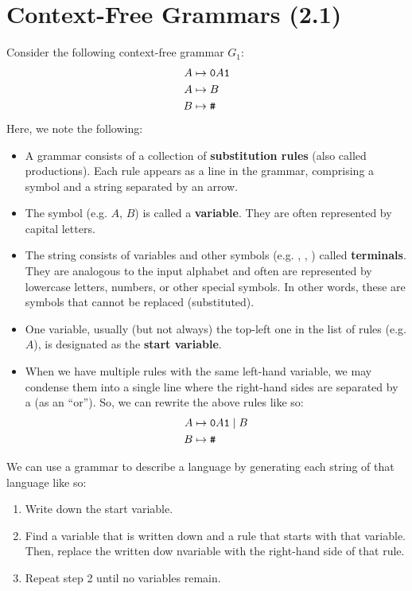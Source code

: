 \documentclass[letterpaper]{article}
\begin{document}
\section{Context-Free Grammars (2.1)}
Consider the following context-free grammar $G_1$:
\begin{equation*}
    \begin{aligned}
        A &\mapsto \texttt{0}A\texttt{1} \\ 
        A &\mapsto B \\ 
        B &\mapsto \texttt{\#}
    \end{aligned}
\end{equation*}
Here, we note the following:  
\begin{itemize}
    \item A grammar consists of a collection of \textbf{substitution rules} (also called productions). Each rule appears as a line in the grammar, comprising a symbol and a string separated by an arrow. 
    \item The symbol (e.g. $A$, $B$) is called a \textbf{variable}. They are often represented by capital letters.  
    \item The string consists of variables and other symbols (e.g. , , \code{\#}) called \textbf{terminals}. They are analogous to the input alphabet and often are represented by lowercase letters, numbers, or other special symbols. In other words, these are symbols that cannot be replaced (substituted). 
    \item One variable, usually (but not always) the top-left one in the list of rules (e.g. $A$), is designated as the \textbf{start variable}.
    \item When we have multiple rules with the same left-hand variable, we may condense them into a single line where the right-hand sides are separated by a \code{|} (as an ``or''). So, we can rewrite the above rules like so: 
    \begin{equation*}
        \begin{aligned}
            A &\mapsto \texttt{0}A\texttt{1} \mid B \\
            B &\mapsto \texttt{\#}
        \end{aligned}
    \end{equation*}
\end{itemize}
We can use a grammar to describe a language by generating each string of that language like so: 
\begin{enumerate}
    \item Write down the start variable. 
    \item Find a variable that is written down and a rule that starts with that variable. Then, replace the written dow nvariable with the right-hand side of that rule. 
    \item Repeat step 2 until no variables remain. 
\end{enumerate}
\end{document}
